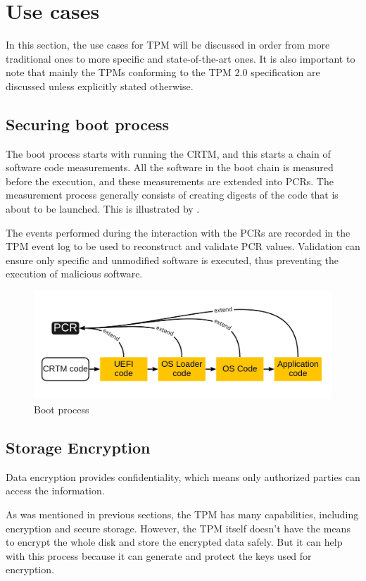 \newpage
\section{Use cases}
In this section, the use cases for TPM will be discussed in order from more traditional ones to more specific and state-of-the-art ones. It is also important to note that mainly the TPMs conforming to the TPM 2.0 specification are discussed unless explicitly stated otherwise.

\subsection{Securing boot process}
The boot process starts with running the CRTM, and this starts a chain of software code measurements. All the software in the boot chain is measured before the execution, and these measurements are extended into PCRs. The measurement process generally consists of creating digests of the code that is about to be launched. This is illustrated by . 

The events performed during the interaction with the PCRs are recorded in the TPM event log \cite{tcg_tpm2_pcspec} to be used to reconstruct and validate PCR values. Validation can ensure only specific and unmodified software is executed, thus preventing the execution of malicious software.

\begin{figure}[H]
    \centering
    \includegraphics[width=\textwidth]{img/boot.jpg}
    \caption{Boot process}
    \label{fig:boot}
\end{figure}

\subsection{Storage Encryption}
Data encryption provides confidentiality, which means only authorized parties can access the information. 

As was mentioned in previous sections, the TPM has many capabilities, including encryption and secure storage. However, the TPM itself doesn't have the means to encrypt the whole disk and store the encrypted data safely. But it can help with this process because it can generate and protect the keys used for encryption.

